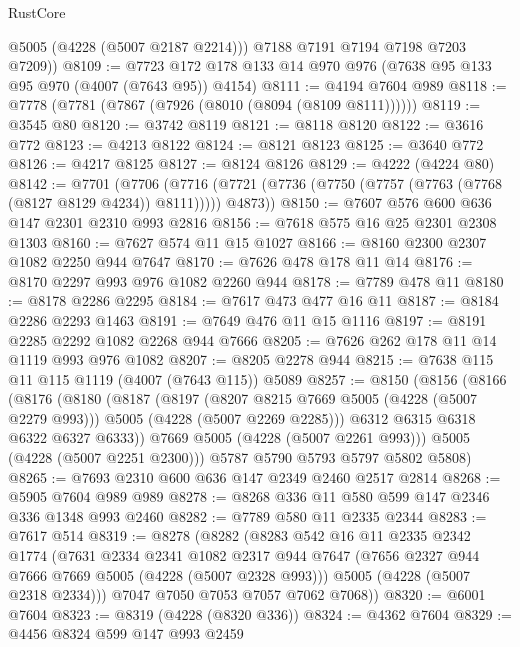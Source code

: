 \begin{lexlean}{RustCore}
\begin{coremodule}
          @5005
          (@4228 (@5007 @2187 @2214)))
        @7188
        @7191
        @7194
        @7198
        @7203
        @7209))
@8109 := @7723 @172 @178 @133 @14 @970 @976 (@7638 @95 @133 @95 @970 (@4007 (@7643 @95)) @4154)
@8111 := @4194 @7604 @989
@8118 := @7778 (@7781 (@7867 (@7926 (@8010 (@8094 (@8109 @8111))))))
@8119 := @3545 @80
@8120 := @3742 @8119
@8121 := @8118 @8120
@8122 := @3616 @772
@8123 := @4213 @8122
@8124 := @8121 @8123
@8125 := @3640 @772
@8126 := @4217 @8125
@8127 := @8124 @8126
@8129 := @4222 (@4224 @80)
@8142 := @7701
    (@7706 (@7716 (@7721 (@7736 (@7750 (@7757 (@7763 (@7768 (@8127 @8129 @4234)) @8111))))) @4873))
@8150 := @7607 @576 @600 @636 @147 @2301 @2310 @993 @2816
@8156 := @7618 @575 @16 @25 @2301 @2308 @1303
@8160 := @7627 @574 @11 @15 @1027
@8166 := @8160 @2300 @2307 @1082 @2250 @944 @7647
@8170 := @7626 @478 @178 @11 @14
@8176 := @8170 @2297 @993 @976 @1082 @2260 @944
@8178 := @7789 @478 @11
@8180 := @8178 @2286 @2295
@8184 := @7617 @473 @477 @16 @11
@8187 := @8184 @2286 @2293 @1463
@8191 := @7649 @476 @11 @15 @1116
@8197 := @8191 @2285 @2292 @1082 @2268 @944 @7666
@8205 := @7626 @262 @178 @11 @14 @1119 @993 @976 @1082
@8207 := @8205 @2278 @944
@8215 := @7638 @115 @11 @115 @1119 (@4007 (@7643 @115)) @5089
@8257 := @8150
    (@8156
      (@8166
        (@8176
          (@8180
            (@8187
              (@8197
                (@8207 @8215 @7669 @5005 (@4228 (@5007 @2279 @993)))
                @5005
                (@4228 (@5007 @2269 @2285)))
              @6312
              @6315
              @6318
              @6322
              @6327
              @6333))
          @7669
          @5005
          (@4228 (@5007 @2261 @993)))
        @5005
        (@4228 (@5007 @2251 @2300)))
      @5787
      @5790
      @5793
      @5797
      @5802
      @5808)
@8265 := @7693 @2310 @600 @636 @147 @2349 @2460 @2517 @2814
@8268 := @5905 @7604 @989 @989
@8278 := @8268 @336 @11 @580 @599 @147 @2346 @336 @1348 @993 @2460
@8282 := @7789 @580 @11 @2335 @2344
@8283 := @7617 @514
@8319 := @8278
    (@8282
      (@8283
        @542
        @16
        @11
        @2335
        @2342
        @1774
        (@7631
          @2334
          @2341
          @1082
          @2317
          @944
          @7647
          (@7656 @2327 @944 @7666 @7669 @5005 (@4228 (@5007 @2328 @993)))
          @5005
          (@4228 (@5007 @2318 @2334)))
        @7047
        @7050
        @7053
        @7057
        @7062
        @7068))
@8320 := @6001 @7604
@8323 := @8319 (@4228 (@8320 @336))
@8324 := @4362 @7604
@8329 := @4456 @8324 @599 @147 @993 @2459

\end{coremodule}
\end{lexlean}
